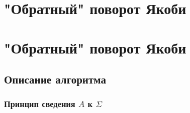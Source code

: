 \section{"Обратный" поворот Якоби}

\section{"Обратный" поворот Якоби}

\subsection{Описание алгоритма}

\subsubsection{Принцип сведения $A$ к $\Sigma$}

